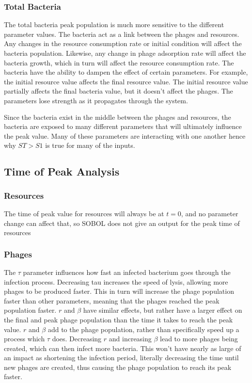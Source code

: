\subsubsection{Total Bacteria}
The total bacteria peak population is much more sensitive to the different parameter values. 
The bacteria act as a link between the phages and resources. Any changes in the resource consumption rate or initial condition will affect the bacteria population. 
Likewise, any change in phage adsorption rate will affect the bacteria growth, which in turn will affect the resource consumption rate. 
The bacteria have the ability to dampen the effect of certain parameters. 
For example, the initial resource value affects the final resource value. 
The initial resource value partially affects the final bacteria value, but it doesn't affect the phages. 
The parameters lose strength as it propagates through the system. 

Since the bacteria exist in the middle between the phages and resources, the bacteria are exposed to many different parameters that will ultimately influence the peak value. 
Many of these parameters are interacting with one another hence why $ST > S1$ is true for many of the inputs. 

\subsection{Time of Peak Analysis}
\subsubsection{Resources}
The time of peak value for resources will always be at $t=0$, and no parameter change can affect that, so SOBOL does not give an output for the peak time of resources
\subsubsection{Phages}
The $\tau$ parameter influences how fast an infected bacterium goes through the infection process. 
Decreasing tau increases the speed of lysis, allowing more phages to be produced faster. 
This in turn will increase the phage population faster than other parameters, meaning that the phages reached the peak population faster.
$r$ and $\beta$ have similar effects, but rather have a larger effect on the final and peak phage population than the time it takes to reach the peak value. 
$r$ and $\beta$ add to the phage population, rather than specifically speed up a process which $\tau$ does. 
Decreasing $r$ and increasing $\beta$ lead to more phages being created, which can then infect more bacteria. 
This won't have nearly as large of an impact as shortening the infection period, literally decreasing the time until new phages are created, thus causing the phage population to reach its peak faster. 

